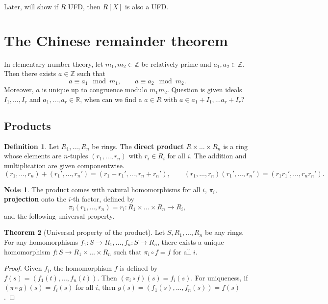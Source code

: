 \documentclass{article}
\newcommand{\Z}{\mathbb{Z}}
\newcommand{\R}{\mathbb{R}}
\newcommand{\rb}[1]{\left( #1 \right)}
\renewcommand{\sb}[1]{\left[ #1 \right]}
\theoremstyle{definition}\newtheorem{definition}{Definition}[subsection]
\theoremstyle{definition}\newtheorem{remark}[definition]{Remark}
\theoremstyle{definition}\newtheorem*{example}{Example}
\theoremstyle{definition}\newtheorem*{note}{Note}
\newtheorem{theorem}[definition]{Theorem}
\begin{document}
Later, will show if $ R $ UFD, then $ R\sb{X} $ is also a UFD.

\section{The Chinese remainder theorem}

In elementary number theory, let $ m_1, m_2 \in \Z $ be relatively prime and $ a_1, a_2 \in \Z $. Then there exists $ a \in \Z $ such that
$$ a \equiv a_1 \mod m_1, \qquad a \equiv a_2 \mod m_2. $$
Moreover, $ a $ is unique up to congruence modulo $ m_1m_2 $. Question is given ideals $ I_1, \dots, I_r $ and $ a_1, \dots, a_r \in \R $, when can we find a $ a \in R $ with $ a \in a_1 + I_1, \dots a_r + I_r $?

\subsection{Products}

\begin{definition}
Let $ R_1, \dots, R_n $ be rings. The \textbf{direct product} $ R \times \dots \times R_n $ is a ring whose elements are $ n $-tuples $ \rb{r_1, \dots, r_n} $ with $ r_i \in R_i $ for all $ i $. The addition and multiplication are given componentwise.
$$ \rb{r_1, \dots, r_n} + \rb{r_1', \dots, r_n'} = \rb{r_1 + r_1', \dots, r_n + r_n'}, \qquad \rb{r_1, \dots, r_n}\rb{r_1', \dots, r_n'} = \rb{r_1r_1', \dots, r_nr_n'}. $$
\end{definition}

\begin{note}
The product comes with natural homomorphisms for all $ i $, $ \pi_i $, \textbf{projection} onto the $ i $-th factor, defined by
$$ \pi_i\rb{r_1, \dots, r_n} = r_i : R_1 \times \dots \times R_n \to R_i, $$
and the following universal property.
\end{note}

\begin{theorem}[Universal property of the product]
Let $ S, R_1, \dots, R_n $ be any rings. For any homomorphisms $ f_1 : S \to R_1, \dots, f_n : S \to R_n $, there exists a unique homomorphism $ f : S \to R_1 \times \dots \times R_n $ such that $ \pi_i \circ f = f $ for all $ i $.
\end{theorem}

\begin{proof}
Given $ f_i $, the homomorphism $ f $ is defined by $ f\rb{s} = \rb{f_1\rb{t}, \dots, f_n\rb{t}} $. Then $ \rb{\pi_i \circ f}\rb{s} = f_i\rb{s} $. For uniqueness, if $ \rb{\pi \circ g}\rb{s} = f_i\rb{s} $ for all $ i $, then $ g\rb{s} = \rb{f_1\rb{s}, \dots, f_n\rb{s}} = f\rb{s} $.
\end{proof}
\end{document}
